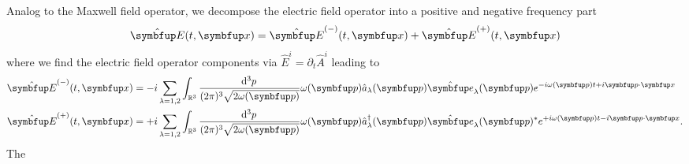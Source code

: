 Analog to the Maxwell field operator, we decompose the electric field operator into a positive and negative frequency part
\begin{equation}
	\vu{E}(t,\vb{x})
	=
	\vu{E}^{(-)}(t,\vb{x})
	+
	\vu{E}^{(+)}(t,\vb{x})
	\label{eq:electric_operator}
\end{equation}
where we find the electric field operator components via $\hat{E}^i=\partial_t\hat{A}^i$ leading to
\begin{align}
	\vu{E}^{(-)}(t,\vb{x})
	&=
	-i
	\sum_{\lambda=1,2}
	\int_{\mathbb{R}^3}\frac{\dd[3]{p}}{(2\pi)^3\sqrt{2\omega(\vb{p})}}
	\omega(\vb{p})
	\hat{a}_\lambda(\vb{p})
	\vu{e}_\lambda(\vb{p})
	e^{-i\omega(\vb{p})t+i\vb{p}\vdot\vb{x}}
	\label{eq:electric_negative_operator}
	\\
	\vu{E}^{(+)}(t,\vb{x})
	&=
	+i
	\sum_{\lambda=1,2}
	\int_{\mathbb{R}^3}\frac{\dd[3]{p}}{(2\pi)^3\sqrt{2\omega(\vb{p})}}
	\omega(\vb{p})
	\hat{a}_\lambda^\dagger(\vb{p})
	\vu{e}_\lambda(\vb{p})^*
	e^{+i\omega(\vb{p})t-i\vb{p}\vdot\vb{x}}
	\label{eq:electric_positive_operator}
	.
\end{align}
The 

